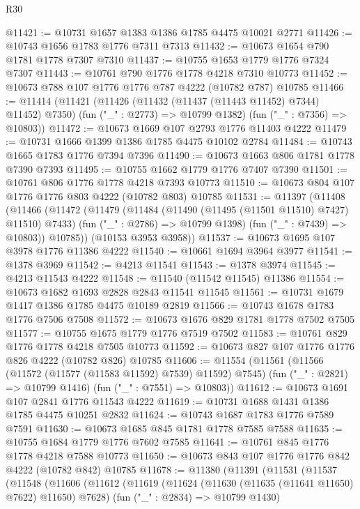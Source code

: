 \begin{lexlean}{R30}
\begin{coremodule}
@11421 := @10731 @1657 @1383 @1386 @1785 @4475 @10021 @2771
@11426 := @10743 @1656 @1783 @1776 @7311 @7313
@11432 := @10673 @1654 @790 @1781 @1778 @7307 @7310
@11437 := @10755 @1653 @1779 @1776 @7324 @7307
@11443 := @10761 @790 @1776 @1778 @4218 @7310 @10773
@11452 := @10673 @788 @107 @1776 @1776 @787 @4222 (@10782 @787) @10785
@11466 := @11414
    (@11421
      (@11426 (@11432 (@11437 (@11443 @11452) @7344) @11452) @7350)
      (fun ("_" : @2773) => @10799 @1382)
      (fun ("_" : @7356) => @10803))
@11472 := @10673 @1669 @107 @2793 @1776 @11403 @4222
@11479 := @10731 @1666 @1399 @1386 @1785 @4475 @10102 @2784
@11484 := @10743 @1665 @1783 @1776 @7394 @7396
@11490 := @10673 @1663 @806 @1781 @1778 @7390 @7393
@11495 := @10755 @1662 @1779 @1776 @7407 @7390
@11501 := @10761 @806 @1776 @1778 @4218 @7393 @10773
@11510 := @10673 @804 @107 @1776 @1776 @803 @4222 (@10782 @803) @10785
@11531 := @11397
    (@11408
      (@11466
        (@11472
          (@11479
            (@11484 (@11490 (@11495 (@11501 @11510) @7427) @11510) @7433)
            (fun ("_" : @2786) => @10799 @1398)
            (fun ("_" : @7439) => @10803))
          @10785))
      (@10153 @3953 @3958))
@11537 := @10673 @1695 @107 @3978 @1776 @11386 @4222
@11540 := @10661 @1694 @3964 @3977
@11541 := @1378 @3969
@11542 := @4213 @11541
@11543 := @1378 @3974
@11545 := @4213 @11543 @4222
@11548 := @11540 (@11542 @11545) @11386
@11554 := @10673 @1682 @1693 @2828 @2843 @11541 @11545
@11561 := @10731 @1679 @1417 @1386 @1785 @4475 @10189 @2819
@11566 := @10743 @1678 @1783 @1776 @7506 @7508
@11572 := @10673 @1676 @829 @1781 @1778 @7502 @7505
@11577 := @10755 @1675 @1779 @1776 @7519 @7502
@11583 := @10761 @829 @1776 @1778 @4218 @7505 @10773
@11592 := @10673 @827 @107 @1776 @1776 @826 @4222 (@10782 @826) @10785
@11606 := @11554
    (@11561
      (@11566 (@11572 (@11577 (@11583 @11592) @7539) @11592) @7545)
      (fun ("_" : @2821) => @10799 @1416)
      (fun ("_" : @7551) => @10803))
@11612 := @10673 @1691 @107 @2841 @1776 @11543 @4222
@11619 := @10731 @1688 @1431 @1386 @1785 @4475 @10251 @2832
@11624 := @10743 @1687 @1783 @1776 @7589 @7591
@11630 := @10673 @1685 @845 @1781 @1778 @7585 @7588
@11635 := @10755 @1684 @1779 @1776 @7602 @7585
@11641 := @10761 @845 @1776 @1778 @4218 @7588 @10773
@11650 := @10673 @843 @107 @1776 @1776 @842 @4222 (@10782 @842) @10785
@11678 := @11380
    (@11391
      (@11531
        (@11537
          (@11548
            (@11606
              (@11612
                (@11619
                  (@11624 (@11630 (@11635 (@11641 @11650) @7622) @11650) @7628)
                  (fun ("_" : @2834) => @10799 @1430)

\end{coremodule}
\end{lexlean}
